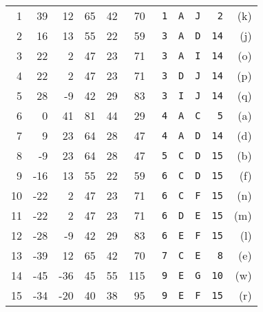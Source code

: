 \documentclass[10pt,a4paper]{article}
\begin{document}
	\begin{table}[tbh]
		\caption{} 
		\label{tab:simRhos}
		\begin{center}       
			\begin{threeparttable}
				\centering
				\begin{tabular}{r|rr|rrr|rrrr|r} 
					\rowcolor{DScol1!25}  1 & 39 & 12 & 65 & 42 & 70 & \texttt{ 1} & \texttt{A} & \texttt{J} & \texttt{ 2} &  (k) \\
					\rowcolor{DScol2!25}  2 & 16 & 13 & 55 & 22 & 59 & \texttt{ 3} & \texttt{A} & \texttt{D} & \texttt{14} &  (j) \\
					\rowcolor{DScol3!25}  3 & 22 &  2 & 47 & 23 & 71 & \texttt{ 3} & \texttt{A} & \texttt{I} & \texttt{14} &  (o) \\
					\rowcolor{DScol4!25}  4 & 22 &  2 & 47 & 23 & 71 & \texttt{ 3} & \texttt{D} & \texttt{J} & \texttt{14} &  (p) \\
					\rowcolor{DScol5!25}  5 & 28 & -9 & 42 & 29 & 83 & \texttt{ 3} & \texttt{I} & \texttt{J} & \texttt{14} &  (q) \\
					\rowcolor{DScol6!25}  6 &  0 & 41 & 81 & 44 & 29 & \texttt{ 4} & \texttt{A} & \texttt{C} & \texttt{ 5} &  (a) \\
					\rowcolor{DScol7!25}  7 &  9 & 23 & 64 & 28 & 47 & \texttt{ 4} & \texttt{A} & \texttt{D} & \texttt{14} &  (d) \\
					\rowcolor{DScol8!25}  8 & -9 & 23 & 64 & 28 & 47 & \texttt{ 5} & \texttt{C} & \texttt{D} & \texttt{15} &  (b) \\
					\rowcolor{DScol9!25}  9 & -16 & 13 & 55 & 22 & 59 & \texttt{ 6} & \texttt{C} & \texttt{D} & \texttt{15} &  (f) \\
					\rowcolor{DScol10!25} 10 & -22 &  2 & 47 & 23 & 71 & \texttt{ 6} & \texttt{C} & \texttt{F} & \texttt{15} &  (n) \\
					\rowcolor{DScol11!25} 11 & -22 &  2 & 47 & 23 & 71 & \texttt{ 6} & \texttt{D} & \texttt{E} & \texttt{15} &  (m) \\
					\rowcolor{DScol12!25} 12 & -28 & -9 & 42 & 29 & 83 & \texttt{ 6} & \texttt{E} & \texttt{F} & \texttt{15} &  (l) \\
					\rowcolor{DScol13!25} 13 & -39 & 12 & 65 & 42 & 70 & \texttt{ 7} & \texttt{C} & \texttt{E} & \texttt{ 8} &  (e) \\
					\rowcolor{DScol14!25} 14 & -45 & -36 & 45 & 55 & 115 & \texttt{ 9} & \texttt{E} & \texttt{G} & \texttt{10} &  (w) \\
					\rowcolor{DScol15!25} 15 & -34 & -20 & 40 & 38 & 95 & \texttt{ 9} & \texttt{E} & \texttt{F} & \texttt{15} &  (r) \\

\end{tabular}
\end{threeparttable}
\end{center}
\end{table}
\end{document}
